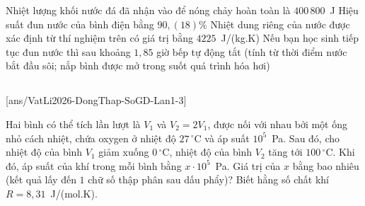\begin{ex}
\begin{minipage}[c]{0.38\linewidth}
		\end{minipage}
		\choiceTFt
		{\True Nhiệt lượng khối nước đá đã nhận vào để nóng chảy hoàn toàn là $400\,800$~J}
		{Hiệu suất đun nước của bình điện bằng $90{,}(18)\%$}
		{\True Nhiệt dung riêng của nước được xác định từ thí nghiệm trên có giá trị bằng $4225$~J/(kg.K)}
		{\True Nếu bạn học sinh tiếp tục đun nước thì sau khoảng $1{,}85$ giờ bếp tự động tắt (tính từ thời điểm nước bắt đầu sôi; nắp bình được mở trong suốt quá trình hóa hơi)}
	\end{ex}

	\subsection*{}
	\setcounter{ex}{0}
	[ans/VatLi2026-DongThap-SoGD-Lan1-3]

	\begin{ex}%
		Hai bình có thể tích lần lượt là $V_1$ và $V_2=2V_1$, được nối với nhau bởi một ống nhỏ cách nhiệt, chứa oxygen ở nhiệt độ $27\,^\circ\text{C}$ và áp suất $10^5$~Pa. Sau đó, cho nhiệt độ của bình $V_1$ giảm xuống $0\,^\circ\text{C}$, nhiệt độ của bình $V_2$ tăng tới $100\,^\circ\text{C}$. Khi đó, áp suất của khí trong mỗi bình bằng $x\cdot 10^5$~Pa. Giá trị của $x$ bằng bao nhiêu (kết quả lấy đến $1$ chữ số thập phân sau dấu phẩy)? Biết hằng số chất khí $R=8{,}31$~J/(mol.K).
		\par
	\end{ex}

